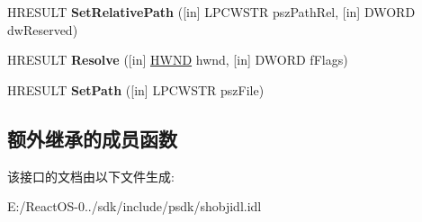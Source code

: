 \begin{DoxyCompactItemize}
H\+R\+E\+S\+U\+LT {\bfseries Set\+Relative\+Path} (\mbox{[}in\mbox{]} L\+P\+C\+W\+S\+TR psz\+Path\+Rel, \mbox{[}in\mbox{]} D\+W\+O\+RD dw\+Reserved)
\item 
\mbox{\label{interface_i_shell_link_w_ae96e948b746ac86eab90d487bccf6cf3}} 
H\+R\+E\+S\+U\+LT {\bfseries Resolve} (\mbox{[}in\mbox{]} \hyperlink{interfacevoid}{H\+W\+ND} hwnd, \mbox{[}in\mbox{]} D\+W\+O\+RD f\+Flags)
\item 
\mbox{\label{interface_i_shell_link_w_a4e22040353fde718bb6cb6bba3712032}} 
H\+R\+E\+S\+U\+LT {\bfseries Set\+Path} (\mbox{[}in\mbox{]} L\+P\+C\+W\+S\+TR psz\+File)
\end{DoxyCompactItemize}
\subsection*{额外继承的成员函数}


该接口的文档由以下文件生成\+:\begin{DoxyCompactItemize}
\item 
E\+:/\+React\+O\+S-\/0../sdk/include/psdk/shobjidl.\+idl\end{DoxyCompactItemize}
